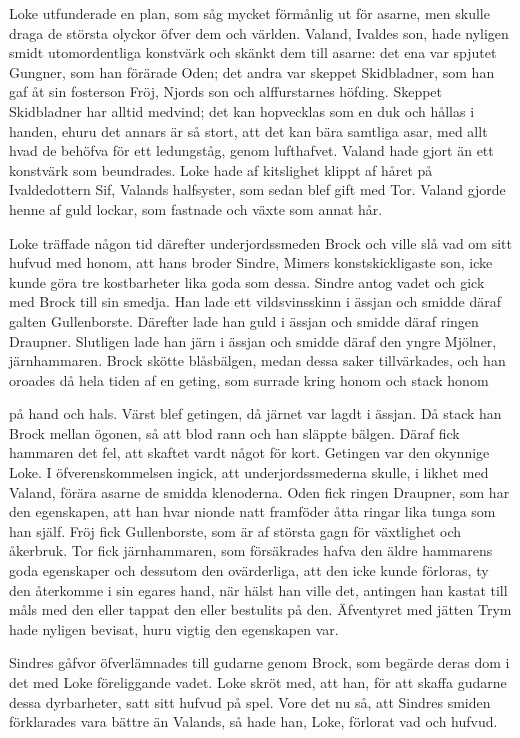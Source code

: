 
Loke utfunderade en plan, som såg mycket förmånlig ut för asarne, men
skulle draga de största olyckor öfver dem och världen. Valand, Ivaldes
son, hade nyligen smidt utomordentliga konstvärk och skänkt dem till
asarne: det ena var spjutet Gungner, som han förärade Oden; det andra
var skeppet Skidbladner, som han gaf åt sin fosterson Fröj, Njords son
och alffurstarnes höfding. Skeppet Skidbladner har alltid medvind; det
kan hopvecklas som en duk och hållas i handen, ehuru det annars är så
stort, att det kan bära samtliga asar, med allt hvad de behöfva för ett
ledungståg, genom lufthafvet. Valand hade gjort än ett konstvärk som
beundrades. Loke hade af kitslighet klippt af håret på Ivaldedottern
Sif, Valands halfsyster, som sedan blef gift med Tor. Valand gjorde
henne af guld lockar, som fastnade och växte som annat hår.

Loke träffade någon tid därefter underjordssmeden Brock och ville slå
vad om sitt hufvud med honom, att hans broder Sindre, Mimers
konstskickligaste son, icke kunde göra tre kostbarheter lika goda som
dessa. Sindre antog vadet och gick med Brock till sin smedja. Han lade
ett vildsvinsskinn i ässjan och smidde däraf galten Gullenborste.
Därefter lade han guld i ässjan och smidde däraf ringen Draupner.
Slutligen lade han järn i ässjan och smidde däraf den yngre Mjölner,
järnhammaren. Brock skötte blåsbälgen, medan dessa saker tillvärkades,
och han oroades då hela tiden af en geting, som surrade kring honom och
stack honom

på hand och hals. Värst blef getingen, då järnet var lagdt i ässjan. Då
stack han Brock mellan ögonen, så att blod rann och han släppte bälgen.
Däraf fick hammaren det fel, att skaftet vardt något för kort. Getingen
var den okynnige Loke. I öfverenskommelsen ingick, att
underjordssmederna skulle, i likhet med Valand, förära asarne de smidda
klenoderna. Oden fick ringen Draupner, som har den egenskapen, att han
hvar nionde natt framföder åtta ringar lika tunga som han själf. Fröj
fick Gullenborste, som är af största gagn för växtlighet och åkerbruk.
Tor fick järnhammaren, som försäkrades hafva den äldre hammarens goda
egenskaper och dessutom den ovärderliga, att den icke kunde förloras, ty
den återkomme i sin egares hand, när hälst han ville det, antingen han
kastat till måls med den eller tappat den eller bestulits på den.
Äfventyret med jätten Trym hade nyligen bevisat, huru vigtig den
egenskapen var.

Sindres gåfvor öfverlämnades till gudarne genom Brock, som begärde deras
dom i det med Loke föreliggande vadet. Loke skröt med, att han, för att
skaffa gudarne dessa dyrbarheter, satt sitt hufvud på spel. Vore det nu
så, att Sindres smiden förklarades vara bättre än Valands, så hade han,
Loke, förlorat vad och hufvud.

